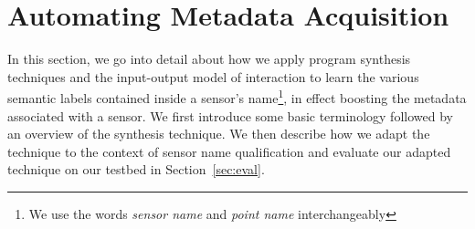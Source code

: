 \section{Automating Metadata Acquisition}
%
%

In this section, we go into detail about how we apply program synthesis techniques and the input-output model of interaction to learn the various semantic labels contained inside a sensor's name\footnote{We use the words {\it sensor name} and {\it point name} interchangeably }, in effect boosting the metadata associated with a sensor.  We first introduce some basic terminology followed by an overview of the synthesis technique. We then describe how we adapt the technique to the context of sensor name qualification and evaluate our adapted technique on our testbed in Section~\ref{sec:eval}.

%

